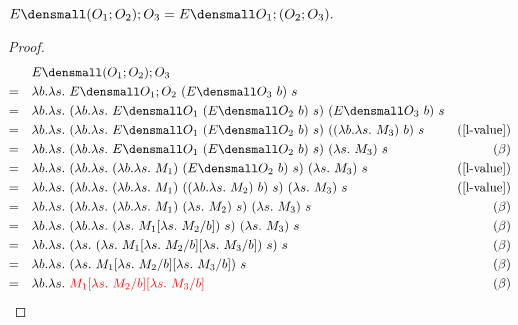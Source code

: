 \begin{lemma}
  \label{thm:ext-compose-assoc}
  \\
  $ E\den{(O_1;O_2);O_3} = E\den{O_1;(O_2;O_3)}.$
\end{lemma}
    \begin{proof}
        \begin{align*}
            &\quad E\den{(O_1;O_2);O_3} \\
            =& \quad \lambda b. \lambda s.~ E\den{O_1;O_2} ~(E\den{O_3} ~b) ~s \\
            =& \quad \lambda b. \lambda s.~ (\lambda b. \lambda s.~ E\den{O_1} ~(E\den{O_2} ~b) ~s) ~(E\den{O_3} ~b) ~s \\
            =& \quad \lambda b. \lambda s.~ (\lambda b. \lambda s.~ E\den{O_1} ~(E\den{O_2} ~b) ~s) ~((\lambda b. \lambda s.~ M_3) ~b) ~s & (\cref{l-value})\\
            =& \quad \lambda b. \lambda s.~ (\lambda b. \lambda s.~ E\den{O_1} ~(E\den{O_2} ~b) ~s) ~(\lambda s.~ M_3) ~s & (\beta)\\
            =& \quad \lambda b. \lambda s.~ (\lambda b. \lambda s.~ (\lambda b. \lambda s.~ M_1) ~(E\den{O_2} ~b) ~s) ~(\lambda s.~ M_3) ~s & (\cref{l-value})\\
            =& \quad \lambda b. \lambda s.~ (\lambda b. \lambda s.~ (\lambda b. \lambda s.~ M_1) ~((\lambda b. \lambda s.~ M_2) ~b) ~s) ~(\lambda s.~ M_3) ~s & (\cref{l-value})\\
            =& \quad \lambda b. \lambda s.~ (\lambda b. \lambda s.~ (\lambda b. \lambda s.~ M_1) ~(\lambda s.~ M_2) ~s) ~(\lambda s.~ M_3) ~s & (\beta) \\
            =& \quad \lambda b. \lambda s.~ (\lambda b. \lambda s.~ (\lambda s.~ M_1\subst{b}{\lambda s.~ M_2}) ~s) ~(\lambda s.~ M_3) ~s & (\beta) \\
            =& \quad \lambda b. \lambda s.~ (\lambda s.~ (\lambda s.~ M_1\subst{b}{\lambda s.~ M_2}\subst{b}{\lambda s.~ M_3}) ~s) ~s & (\beta) \\
            =& \quad \lambda b. \lambda s.~ (\lambda s.~ M_1\subst{b}{\lambda s.~ M_2}\subst{b}{\lambda s.~ M_3}) ~s & (\beta) \\
            =& \quad \lambda b. \lambda s.~ \color{red}{M_1\subst{b}{\lambda s.~ M_2}\subst{b}{\lambda s.~ M_3}} & (\beta)
        \end{align*}


\end{proof}
